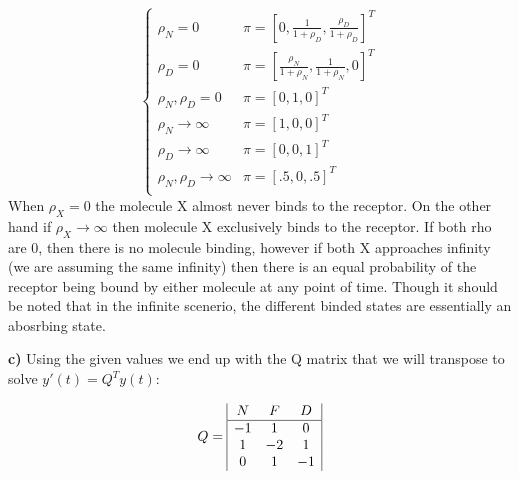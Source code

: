 \documentclass{article}
\begin{document}
\[
\begin{cases}
    \rho_N = 0 & \pi = \left[0,\frac{1}{1 + \rho_D},\frac{\rho_D}{1 + \rho_D}\right]^T\\
    \rho_D = 0 &\pi = \left[\frac{\rho_N}{1 + \rho_N},\frac{1}{1 + \rho_N},0\right]^T\\
    \rho_N,\rho_D = 0 &\pi = \left[0,1,0\right]^T\\
    \rho_N \to \infty &\pi = \left[1,0,0\right]^T\\
    \rho_D \to \infty &\pi = \left[0,0,1\right]^T\\
    \rho_N,\rho_D \to \infty &\pi = \left[.5,0,.5\right]^T\\
\end{cases}
\]
When $\rho_X=0$ the molecule X almost never binds to the receptor. On the other hand
if $\rho_X \to \infty$ then molecule X exclusively binds to the receptor. If both rho are 0, then there is no
molecule binding, however if both X approaches infinity (we are assuming the same infinity) then there is an equal 
probability of the receptor being bound by either molecule at any point of time. Though it should be noted that in 
the infinite scenerio, the different binded states are essentially an abosrbing state.

\textbf{c)}
Using the given values we end up with the Q matrix that we will transpose to solve $y'(t) = Q^Ty(t)$:

\[
Q = \begin{array}{|c c c|}
N & F & D\\
\hline
-1&1&0\\
1&-2&1\\
0&1&-1\\
\end{array}
\]
\end{document}

